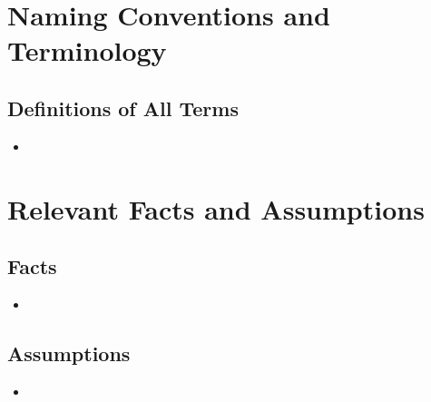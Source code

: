 \documentclass{article}
\begin{document}
\section{Naming Conventions and Terminology}
\subsection{Definitions of All Terms}
\begin{itemize}
	
\item

	
\end{itemize}

\section{Relevant Facts and Assumptions}


\subsection{Facts}
\begin{itemize}
	
\item
	
	
\end{itemize}

\subsection{Assumptions}
\begin{itemize}
	
\item
	
\end{itemize}

\end{document}
